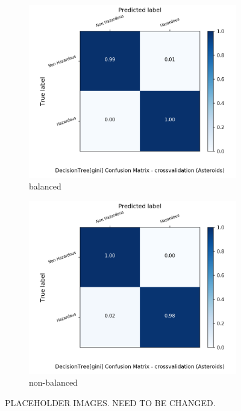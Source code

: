 \documentclass{article}
\begin{document}
\begin{figure}[H]
	\centering
	\begin{subfigure}{.5\textwidth}
		\centering
		\includegraphics[width=1.1\textwidth]{Plots/asteroids/asteroids_DecisionTree_gini_balance_True_crossvalidation.png}
		\caption{balanced}
	\end{subfigure}%
	\begin{subfigure}{.5\textwidth}
		\centering
		\includegraphics[width=1.1\textwidth]{Plots/asteroids/asteroids_DecisionTree_gini_balance_False_crossvalidation.png}
		\caption{non-balanced}
	\end{subfigure}
	\caption{{\color{red} PLACEHOLDER IMAGES. NEED TO BE CHANGED.}}
\end{figure}
\end{document}
